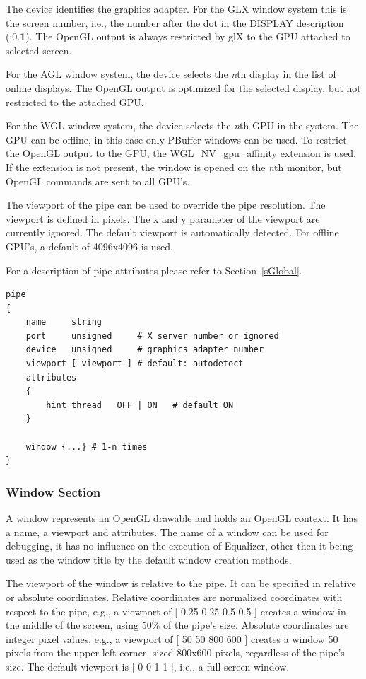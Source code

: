 \documentclass[10pt,a4]{scrartcl}
\newcommand{\sref}[1]{Section~\ref{#1}}
\begin{document}
The device identifies the graphics adapter. For the GLX window system
this is the screen number, i.e., the number after the dot in the DISPLAY
description (:0.\textbf{1}). The OpenGL output is always restricted by
glX to the GPU attached to selected screen.

For the AGL window system, the device selects the \textit{n}th display
in the list of online displays. The OpenGL output is optimized for the
selected display, but not restricted to the attached GPU.

For the WGL window system, the device selects the \textit{n}th GPU in
the system. The GPU can be offline, in this case only PBuffer windows
can be used. To restrict the OpenGL output to the GPU, the
\textsf{WGL\_NV\_gpu\_affinity} extension is used. If the extension is
not present, the window is opened on the \textit{n}th monitor, but
OpenGL commands are sent to all GPU's.

The viewport of the pipe can be used to override the pipe
resolution. The viewport is defined in pixels. The x and y parameter of
the viewport are currently ignored. The default viewport is
automatically detected. For offline GPU's, a default of 4096x4096 is
used.

For a description of pipe attributes please refer to \sref{sGlobal}.

{\footnotesize\begin{lstlisting}
pipe
{
    name     string
    port     unsigned     # X server number or ignored
    device   unsigned     # graphics adapter number
    viewport [ viewport ] # default: autodetect
    attributes
    {
        hint_thread   OFF | ON   # default ON
    }

    window {...} # 1-n times
}
\end{lstlisting}}

\subsubsection{Window Section}

A window represents an OpenGL drawable and holds an OpenGL context. It
has a name, a viewport and attributes. The name of a window can be used
for debugging, it has no influence on the execution of Equalizer, other
then it being used as the window title by the default window creation
methods.

The viewport of the window is relative to the pipe. It can be specified
in relative or absolute coordinates. Relative coordinates are normalized
coordinates with respect to the pipe, e.g., a viewport of \textsf{[ 0.25
  0.25 0.5 0.5 ]} creates a window in the middle of the screen, using
50\% of the pipe's size. Absolute coordinates are integer pixel values,
e.g., a viewport of \textsf{[ 50 50 800 600 ]} creates a window 50 pixels
from the upper-left corner, sized 800x600 pixels, regardless of the
pipe's size. The default viewport is \textsf{[ 0 0 1 1 ]}, i.e., a
full-screen window. 
\end{document}
